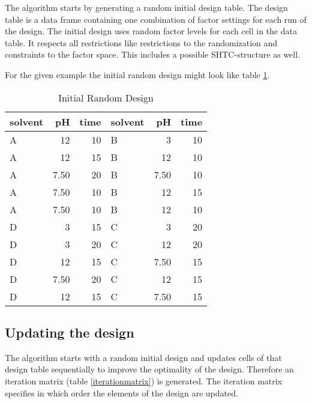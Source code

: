 The algorithm starts by generating a random initial design table. The design table is a data frame containing one combination of factor settings for each run of the design. The initial design uses random factor levels for each cell in the data table. It respects all restrictions like restrictions to the randomization and constraints to the factor space. This includes a possible SHTC-structure as well.

For the given example the initial random design might look like table \ref{initDoE}.

\begin{table}[ht]
\centering
\begin{tabular}{lrr|lrr}
  \hline
solvent & pH & time & solvent & pH & time \\ 
 \hline \hline
A & 12 & 10 & B & 3 & 10 \\ 
A & 12 & 15 & B & 12 & 10 \\ 
A & 7.50 & 20 & B & 7.50 & 10 \\ 
A & 7.50 & 10 & B & 12 & 15 \\ 
A & 7.50 & 10 & B & 12 & 10 \\ 
D & 3 & 15 & C & 3 & 20 \\ 
D & 3 & 20 & C & 12 & 20 \\ 
D & 12 & 15 & C & 7.50 & 15 \\ 
D & 7.50 & 20 & C & 12 & 15 \\ 
D & 12 & 15 & C & 7.50 & 15 \\ 
   \hline
\end{tabular}
\caption{Initial Random Design}
\label{initDoE}
\end{table}

\subsection{Updating the design}

The algorithm starts with a random initial design and updates cells of that design table sequentially to improve the optimality of the design. Therefore an iteration matrix (table \ref{iterationmatrix}) is generated. The iteration matrix specifies in which order the elements of the design are updated.

